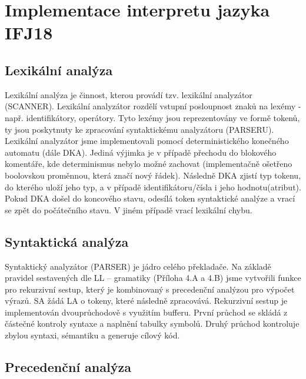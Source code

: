 \documentclass[a4paper, 12pt]{article}
\begin{document}
\newpage

\section{Implementace interpretu jazyka IFJ18} \label{implementace}
\subsection{Lexikální analýza} \label{lexer}

Lexikální analýza je činnost, kterou provádí tzv. lexikální analyzátor (SCANNER). 
Lexikální analyzátor rozdělí vstupní posloupnost znaků na lexémy - např. identifikátory, operátory. 
Tyto lexémy jsou reprezentovány ve formě tokenů, ty jsou poskytnuty ke zpracování syntaktickému analyzátoru (PARSERU). Lexikální analyzátor jsme implementovali pomocí deterministického konečného automatu (dále DKA). Jediná výjimka je v případě přechodu do blokového komentáře, kde determinismus nebylo možné zachovat (implementačně ošetřeno boolovskou proměnnou, která značí nový řádek). Následně DKA zjistí typ tokenu, do kterého uloží jeho typ, a v případě identifikátoru/čísla i jeho hodnotu(atribut). Pokud DKA došel do koncového stavu, odesílá token syntaktické analýze a vrací se zpět do počátečního stavu. V jiném případě vrací lexikální chybu. 

\subsection{Syntaktická analýza} \label{parser}

Syntaktický analyzátor (PARSER) je jádro celého překladače. Na základě pravidel sestavených dle LL – gramatiky (Příloha 4.A a 4.B) jsme vytvořili funkce pro rekurzivní sestup, který je kombinovaný s precedenční analýzou pro výpočet výrazů. SA žádá LA o tokeny, které následně zpracovává. Rekurzivní sestup je implementován dvouprůchodově s využitím bufferu. První průchod se skládá z částečné kontroly syntaxe a naplnění tabulky symbolů. Druhý průchod kontroluje zbylou syntaxi, sémantiku a generuje cílový kód.     

\subsection{Precedenční analýza} \label{prec_analyza}
\end{document}
